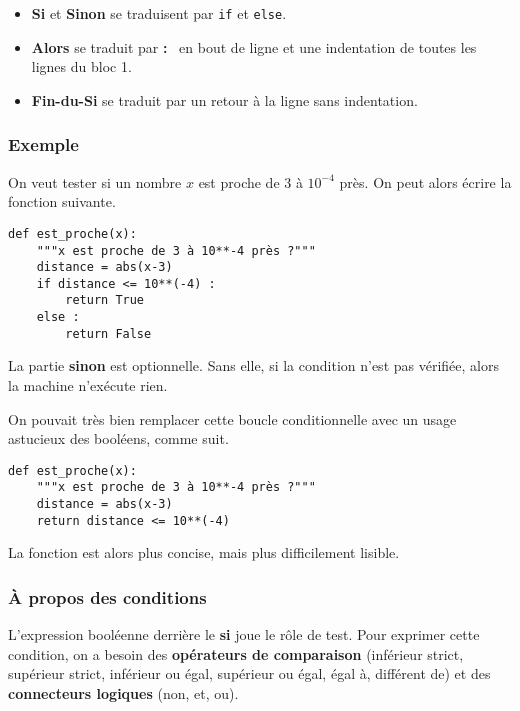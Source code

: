  \begin{itemize}
 \item \textbf{Si} et \textbf{Sinon} se traduisent par \texttt{if} et \texttt{else}. 
 
 \item \textbf{Alors} se traduit par \og \textbf{:} \fg\ en bout de ligne et une indentation de toutes les 
lignes du bloc 1.
 
 \item \textbf{Fin-du-Si} se traduit par un retour à la ligne sans indentation. 
 
 \end{itemize}

 
\subsubsection{Exemple}

On veut tester si un nombre $x$ est proche de 3 à $10^{-4}$ près. On peut alors écrire la fonction suivante. 

\begin{lstlisting}
def est_proche(x):
    """x est proche de 3 à 10**-4 près ?"""
    distance = abs(x-3)
    if distance <= 10**(-4) : 
        return True 
    else : 
        return False
\end{lstlisting}



\begin{rem} 
La partie \textbf{sinon} est optionnelle. Sans elle, si la condition n'est pas vérifiée, alors la 
machine n'exécute rien.
\end{rem}

\begin{rem}
  On pouvait très bien remplacer cette boucle conditionnelle avec un usage astucieux des booléens, comme suit.
\begin{lstlisting}
def est_proche(x):
    """x est proche de 3 à 10**-4 près ?"""
    distance = abs(x-3)
    return distance <= 10**(-4)
\end{lstlisting}
La fonction est alors plus concise, mais plus difficilement lisible. 
\end{rem}


\subsubsection{\`A propos des conditions}

L'expression booléenne derrière le \textbf{si} joue le rôle de test. Pour exprimer cette condition, 
on a besoin des \textbf{opérateurs de comparaison} (inférieur strict, supérieur strict, inférieur ou 
égal, supérieur ou égal, égal à, différent de) et des \textbf{connecteurs logiques}
(non, et, ou).

